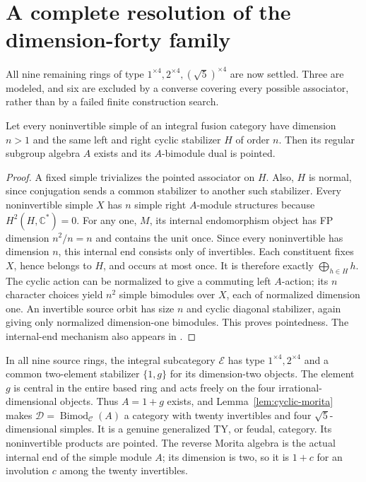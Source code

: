 \section{A complete resolution of the dimension-forty family}
All nine remaining rings of type $1^{\times4},2^{\times4},(\sqrt5)^{\times4}$
are now settled. Three are modeled, and six are excluded by a converse covering
every possible associator, rather than by a failed finite construction search.

\begin{lemma}\label{lem:cyclic-morita}
Let every noninvertible simple of an integral fusion category have dimension $n>1$
and the same left and right cyclic stabilizer $H$ of order $n$. Then its regular
subgroup algebra $A$ exists and its $A$-bimodule dual is pointed.
\end{lemma}
\begin{proof}
A fixed simple trivializes the pointed associator on $H$. Also, $H$ is normal,
since conjugation sends a common stabilizer to another such stabilizer.
Every noninvertible simple $X$ has $n$ simple right $A$-module structures because
$H^2(H,\mathbb C^*)=0$. For any one, $M$, its internal endomorphism object has
FP dimension $n^2/n=n$ and contains the unit once. Since every noninvertible has
dimension $n$, this internal end consists only of invertibles. Each constituent
fixes $X$, hence belongs to $H$, and occurs at most once. It is therefore exactly
$\bigoplus_{h\in H}h$. The cyclic action can be normalized to give a commuting
left $A$-action; its $n$ character choices yield $n^2$ simple bimodules over $X$,
each of normalized dimension one. An invertible source orbit has size $n$ and
cyclic diagonal stabilizer, again giving only normalized dimension-one bimodules.
This proves pointedness. The internal-end mechanism also appears in
\cite[Lemmas 6.1--6.2]{EGO}.
\end{proof}

In all nine source rings, the integral subcategory $\mathcal E$ has type
$1^{\times4},2^{\times4}$ and a common two-element stabilizer $\{1,g\}$ for its
dimension-two objects. The element $g$ is central in the entire based ring and
acts freely on the four irrational-dimensional objects. Thus $A=1+g$ exists,
and Lemma~\ref{lem:cyclic-morita} makes
$\mathcal D=\operatorname{Bimod}_{\mathcal C}(A)$ a category with twenty invertibles
and four $\sqrt5$-dimensional simples. It is a genuine generalized TY, or feudal,
category. Its noninvertible products are pointed. The reverse Morita algebra is
the actual internal end of the simple module $A$; its dimension is two, so it is
$1+c$ for an involution $c$ among the twenty invertibles.

